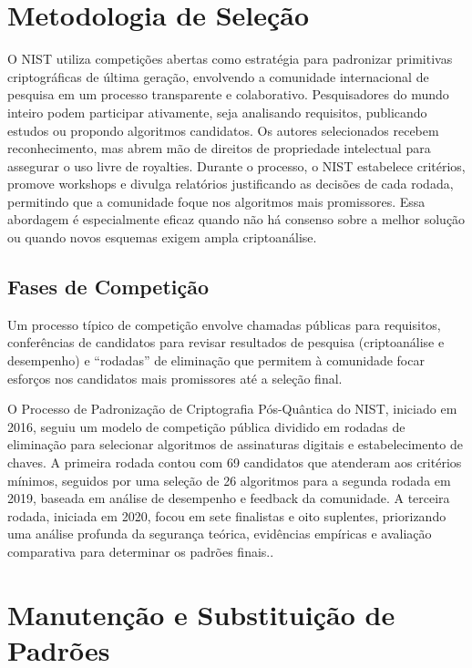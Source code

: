     \section{Metodologia de Seleção}
        O NIST utiliza competições abertas como estratégia para padronizar primitivas criptográficas de última geração, envolvendo a comunidade internacional de pesquisa em um processo transparente e colaborativo\cite{nistIR7977}. Pesquisadores do mundo inteiro podem participar ativamente, seja analisando requisitos, publicando estudos ou propondo algoritmos candidatos\cite{nistIR7977}. Os autores selecionados recebem reconhecimento, mas abrem mão de direitos de propriedade intelectual para assegurar o uso livre de royalties\cite{nistIR7977}. Durante o processo, o NIST estabelece critérios, promove workshops e divulga relatórios justificando as decisões de cada rodada, permitindo que a comunidade foque nos algoritmos mais promissores\cite{nistIR7977}. Essa abordagem é especialmente eficaz quando não há consenso sobre a melhor solução ou quando novos esquemas exigem ampla criptoanálise\cite{nistIR7977}.

        \subsection{Fases de Competição}
            Um processo típico de competição envolve chamadas públicas para requisitos, conferências de candidatos para revisar resultados de pesquisa (criptoanálise e desempenho) e ``rodadas'' de eliminação que permitem à comunidade focar esforços nos candidatos mais promissores até a seleção final\cite{nistIR7977}.

            O Processo de Padronização de Criptografia Pós-Quântica do NIST, iniciado em 2016, seguiu um modelo de competição pública dividido em rodadas de eliminação para selecionar algoritmos de assinaturas digitais e estabelecimento de chaves. A primeira rodada contou com 69 candidatos que atenderam aos critérios mínimos, seguidos por uma seleção de 26 algoritmos para a segunda rodada em 2019, baseada em análise de desempenho e feedback da comunidade. A terceira rodada, iniciada em 2020, focou em sete finalistas e oito suplentes, priorizando uma análise profunda da segurança teórica, evidências empíricas e avaliação comparativa para determinar os padrões finais.\cite{nistIR8413}.

    \section{Manutenção e Substituição de Padrões}
